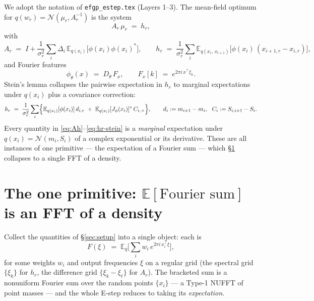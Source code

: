 \documentclass[11pt]{article}
\newcommand{\E}{\mathbb{E}}
\newcommand{\Eq}[1][q]{\mathbb{E}_{#1}}
\newcommand{\Eqx}{\mathbb{E}_{q(x_i)}}
\newcommand{\Eqxx}{\mathbb{E}_{q(x_i,\,x_{i+1})}}
\begin{document}
We adopt the notation of \texttt{efgp\_estep.tex} (Layers 1--3).  The
mean-field optimum for $q(w_r)=\mathcal{N}(\mu_r, A_r^{-1})$ is the
system
\begin{equation}
A_r\,\mu_r \;=\; h_r,
\label{eq:Ah-system}
\end{equation}
with
\begin{equation}
A_r \;=\; I + \frac{1}{\sigma_r^2}\sum_i \Delta_i\,
\Eqx\!\bigl[\phi(x_i)\phi(x_i)^{*}\bigr],
\qquad
h_r \;=\; \frac{1}{\sigma_r^2}\sum_i
\Eqxx\!\bigl[\phi(x_i)\,(x_{i+1,r}-x_{i,r})\bigr],
\label{eq:Ah}
\end{equation}
and Fourier features
\begin{equation}
\phi_\theta(x) \;=\; D_\theta\, F_x,
\qquad
F_x[k] \;=\; e^{2\pi i\, x^\top \xi_k}.
\end{equation}
Stein's lemma collapses the pairwise expectation in $h_r$ to marginal
expectations under $q(x_i)$ plus a covariance correction:
\begin{equation}
h_r \;=\; \frac{1}{\sigma_r^2}\sum_i
\Bigl\{\Eqx[\phi(x_i)]\,d_{i,r}
\;+\; \Eqx[J_\phi(x_i)]^{*}\,C_{i,\cdot r}\Bigr\},
\qquad
d_i := m_{i+1}-m_i,\ \ C_i := S_{i,i+1}-S_i.
\label{eq:hr-stein}
\end{equation}
Every quantity in \eqref{eq:Ah}--\eqref{eq:hr-stein} is a
\emph{marginal} expectation under $q(x_i)\!=\!\mathcal{N}(m_i, S_i)$ of
a complex exponential or its derivative.  These are all instances of
one primitive --- the expectation of a Fourier sum --- which
\S\ref{sec:cf} collapses to a single FFT of a density.

\section{The one primitive: $\E[\text{Fourier sum}]$ is an FFT of a density}
\label{sec:cf}

Collect the quantities of \S\ref{sec:setup} into a single object: each
is
\begin{equation}
F(\xi)\;=\;\Eq\Big[\sum_i w_i\,e^{2\pi i\,x_i^\top\xi}\Big],
\label{eq:primitive}
\end{equation}
for some weights $w_i$ and output frequencies $\xi$ on a regular grid
(the spectral grid $\{\xi_k\}$ for $h_r$, the difference grid
$\{\xi_k-\xi_\ell\}$ for $A_r$).  The bracketed sum is a nonuniform
Fourier sum over the random points $\{x_i\}$ --- a Type-1 NUFFT of point
masses --- and the whole E-step reduces to taking its \emph{expectation}.
\end{document}
